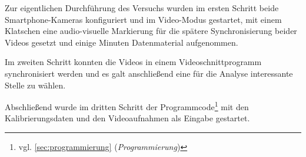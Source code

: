 Zur eigentlichen Durchführung des Versuchs wurden im ersten Schritt beide Smartphone-Kameras konfiguriert und im Video-Modus gestartet, mit einem Klatschen eine audio-visuelle Markierung für die spätere Synchronisierung beider Videos gesetzt und einige Minuten Datenmaterial aufgenommen.\kleinerabstand

\noindent Im zweiten Schritt konnten die Videos in einem Videoschnittprogramm synchronisiert werden und es galt anschließend eine für die Analyse interessante Stelle zu wählen.\kleinerabstand

\noindent Abschließend wurde im dritten Schritt der Programmcode\footnote{vgl. \ref{sec:programmierung} (\emph{Programmierung})} mit den Kalibrierungsdaten und den Videoaufnahmen als Eingabe gestartet.

